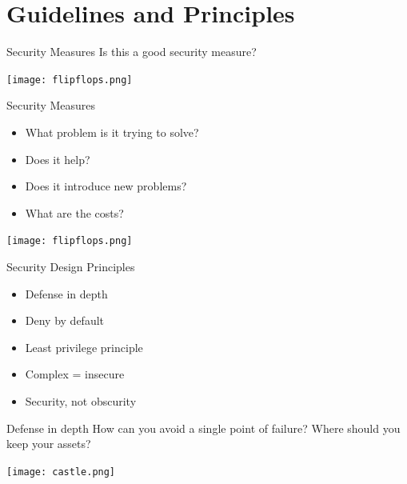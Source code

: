 \documentclass[aspectratio=169]{beamer}
\begin{document}
\section{Guidelines and Principles}
\frame{\sectionpage}

\begin{frame}{Security Measures}
Is this a good security measure?
\begin{center}
\texttt{[image: flipflops.png]}
\end{center}
\end{frame}

\begin{frame}{Security Measures}
\begin{itemize}
 \item What problem is it trying to solve? 
 \item Does it help? 
 \item Does it introduce new problems? 
 \item What are the costs?
 \end{itemize} 
 \begin{center}
	\texttt{[image: flipflops.png]} 
 \end{center}
\end{frame}


\begin{frame}{Security Design Principles}
  \begin{itemize}
    \item Defense in depth
    \item Deny by default
    \item Least privilege principle
    \item Complex = insecure
    \item Security, not obscurity
  \end{itemize}
\end{frame}

\begin{frame}{Defense in depth}
How can you avoid a single point of failure? Where should you keep your assets?
\begin{center}
\texttt{[image: castle.png]}
\end{center}
\end{frame}
\end{document}

